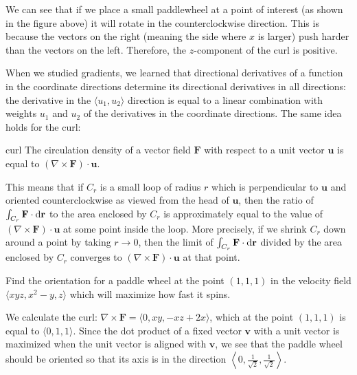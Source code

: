\documentclass{watsonbook}
\begin{document}
\begin{solution}
  We can see that if we place a small paddlewheel at a point of
  interest (as shown in the figure above) it will rotate in the
  counterclockwise direction. This is because the vectors on the right
  (meaning the side where $x$ is larger) push harder than the vectors
  on the left. Therefore, the $z$-component of the curl is
  $\boxed{\text{positive}}$.
\end{solution}

When we studied gradients, we learned that directional
derivatives of a function in the coordinate directions determine its directional
derivatives in all directions: the derivative in the $\langle u_1, u_2
\rangle$ direction is equal to a linear combination with weights $u_1$
and $u_2$ of the derivatives in
the coordinate directions. The same idea holds for the curl: 
\begin{theo}{}{curl} \bang{-3mm} The circulation density of a vector
  field $\mathbf{F}$ with respect to a unit vector $\mathbf{u} $ is
  equal to $\left(\nabla \times \mathbf{F}\right) \cdot
  \mathbf{u}$.
\end{theo}


This means that if $C_r$ is a small loop of radius $r$ which is
perpendicular to $\mathbf{u}$ and oriented counterclockwise as viewed
from the head of $\mathbf{u}$, then the ratio of
$\int_{C_r} \mathbf{F} \cdot \mathrm{d}\mathbf{r}$ to the area enclosed by
$C_r$ is approximately equal to the value of
$\left(\nabla \times \mathbf{F}\right) \cdot \mathbf{u}$ at some point
inside the loop. More precisely, if we shrink $C_r$ down around a
point by taking $r \to 0$, then the limit of
$\int_{C_r} \mathbf{F} \cdot \mathrm{d}\mathbf{r}$ divided by the area
enclosed by $C_r$ converges to
$\left(\nabla \times \mathbf{F}\right) \cdot \mathbf{u}$ at that
point.
\begin{example}{}{}
  Find the orientation for a paddle wheel at the point $(1,1,1)$ in
  the velocity field $\langle xyz,x^2 - y, z \rangle$ which will
  maximize how fast it spins.
\end{example}

\begin{solution}
  We calculate the curl:
  $\nabla \times \mathbf{F} = \langle 0, xy, -xz + 2x \rangle$, which
  at the point $(1,1,1)$ is equal to $\langle 0,1,1 \rangle$. Since
  the dot product of a fixed vector $\mathbf{v}$ with a unit vector is
  maximized when the unit vector is aligned with $\mathbf{v}$, we see
  that the paddle wheel should be oriented so that its axis is in the
  direction
  $\boxed{\left\langle 0, \tfrac{1}{\sqrt{2}}, \tfrac{1}{\sqrt{2}} \right\rangle}$.
\end{solution}
\end{document}
